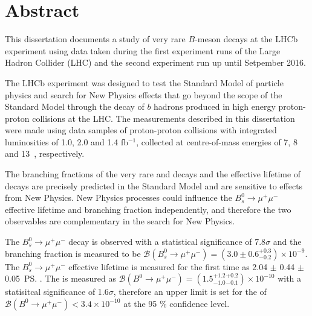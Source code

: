 \chapter{Abstract}

This dissertation documents a study of very rare $B$-meson decays at the LHCb experiment using data taken during the first experiment runs of the Large Hadron Collider (LHC) and the second experiment run up until Setpember 2016.



The LHCb experiment was designed to test the Standard Model of particle physics and search for New Physics effects that go beyond the scope of the Standard Model through the decay of $b$ hadrons produced in high energy proton-proton collisions at the LHC. The measurements described in this dissertation were made using data samples of proton-proton collisions with integrated luminosities of 1.0, 2.0 and 1.4 fb$^{-1}$, collected at centre-of-mass energies of 7, 8 and 13~\tev, respectively. %

The branching fractions of the very rare \bdmumu and \bsmumu decays and the effective lifetime of \bsmumu decays are precisely predicted in the Standard Model and are sensitive to effects from New Physics. 
New Physics processes could influence the $B_{s}^{0} \to \mu^{+} \mu^{-}$  effective lifetime and branching fraction independently, and therefore the two observables are complementary in the search for New Physics. 




The $B_{s}^{0} \to \mu^{+} \mu^{-}$ decay is observed with a statistical significance of 7.8$\sigma$ and the branching fraction is measured to be $\mathcal{B}(B_{s}^{0} \to \mu^{+} \mu^{-}) = (3.0 \pm 0.6^{ +0.3}_{ -0.2}) \times 10^{-9}$. The $B_{s}^{0} \to \mu^{+} \mu^{-}$ effective lifetime is measured for the first time as 2.04 $\pm$ 0.44 $\pm$ 0.05~\ps.
The \bdmumu \BF is measured as $\mathcal{B}(B^{0} \to \mu^{+} \mu^{-}) = (1.5^{+1.2}_{-1.0}^{+0.2}_{-0.1})\times 10^{-10}$ with a statisitcal significance of 1.6$\sigma$, therefore an upper limit is set for the \BF of $\mathcal{B}(B^{0} \to \mu^{+} \mu^{-})< 3.4 \times 10^{-10}$ at the 95 $\%$ confidence level. 

